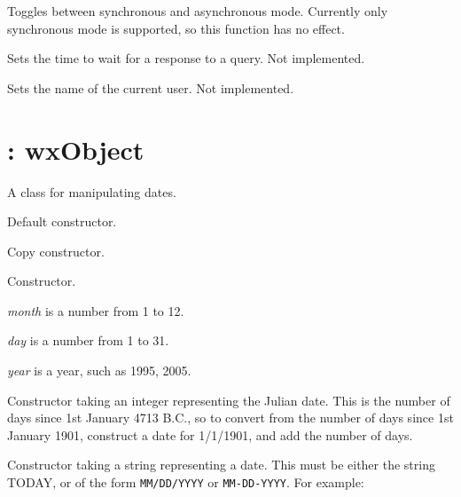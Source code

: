 

Toggles between synchronous and asynchronous mode. Currently only synchronous
mode is supported, so this function has no effect.



Sets the time to wait for a response to a query. Not implemented.
 


Sets the name of the current user. Not implemented.

\section{: wxObject}\label{wxdate}

A class for manipulating dates.



Default constructor.


Copy constructor.


Constructor.

{\it month} is a number from 1 to 12.

{\it day} is a number from 1 to 31.

{\it year} is a year, such as 1995, 2005.


Constructor taking an integer representing the Julian date. This is the number of days since
1st January 4713 B.C., so to convert from the number of days since 1st January 1901,
construct a date for 1/1/1901, and add the number of days.


Constructor taking a string representing a date. This must be either the string TODAY, or of the
form {\tt MM/DD/YYYY} or {\tt MM-DD-YYYY}. For example:

